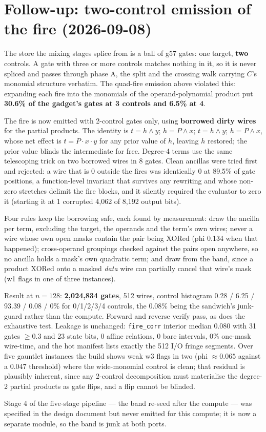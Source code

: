 \documentclass[11pt]{article}
\newcommand{\doc}[1]{\texttt{#1}}
\newcommand{\g}{\textsf{g57}}
\begin{document}
\section{Follow-up: two-control emission of the fire (2026-09-08)}

The store the mixing stages splice from is a ball of \g{} gates: one target, \textbf{two}
controls. A gate with three or more controls matches nothing in it, so it is never spliced and
passes through phase A, the split and the crossing walk carrying $C$'s monomial structure
verbatim. The quad-fire emission above violated this: expanding each fire into the monomials of
the operand-polynomial product put \textbf{30.6\% of the gadget's gates at 3 controls and 6.5\%
at 4}.

The fire is now emitted with 2-control gates only, using \textbf{borrowed dirty wires} for the
partial products. The identity is $t \mathrel{\hat{}}= h{\wedge}y$;
$h \mathrel{\hat{}}= P{\wedge}x$; $t \mathrel{\hat{}}= h{\wedge}y$;
$h \mathrel{\hat{}}= P{\wedge}x$, whose net effect is $t \mathrel{\hat{}}= P{\cdot}x{\cdot}y$ for
any prior value of $h$, leaving $h$ restored; the prior value blinds the intermediate for free.
Degree-4 terms use the same telescoping trick on two borrowed wires in 8 gates. Clean ancillas
were tried first and rejected: a wire that is 0 outside the fires was identically 0 at 89.5\% of
gate positions, a function-level invariant that survives any rewriting and whose non-zero
stretches delimit the fire blocks, and it silently required the evaluator to zero it (starting it
at 1 corrupted 4,062 of 8,192 output bits).

Four rules keep the borrowing safe, each found by measurement: draw the ancilla per term,
excluding the target, the operands and the term's own wires; never a wire whose own open masks
contain the pair being XORed (phi 0.134 when that happened); cross-operand groupings checked
against the pairs open anywhere, so no ancilla holds a mask's own quadratic term; and draw from
the band, since a product XORed onto a masked \emph{data} wire can partially cancel that wire's
mask (w1 flags in one of three instances).

Result at $n=128$: \textbf{2,024,834 gates}, 512 wires, control histogram 0.28 / 6.25 / 93.39 /
0.08 / 0\% for 0/1/2/3/4 controls, the 0.08\% being the sandwich's junk-guard rather than the
compute. Forward and reverse verify pass, as does the exhaustive test. Leakage is unchanged:
\doc{fire\_corr} interior median 0.080 with 31 gates $\ge0.3$ and 23 state bits, 0 affine
relations, 0 bare intervals, 0\% one-mask wire-time, and the hot manifest lists exactly the 512
I/O fringe segments. Over five gauntlet instances the build shows weak w3 flags in two (phi
${\approx}0.065$ against a 0.047 threshold) where the wide-monomial control is clean; that
residual is plausibly inherent, since any 2-control decomposition must materialise the degree-2
partial products as gate flips, and a flip cannot be blinded.

Stage 4 of the five-stage pipeline --- the band re-seed after the compute --- was specified in
the design document but never emitted for this compute; it is now a separate module, so the band
is junk at both ports.
\end{document}
